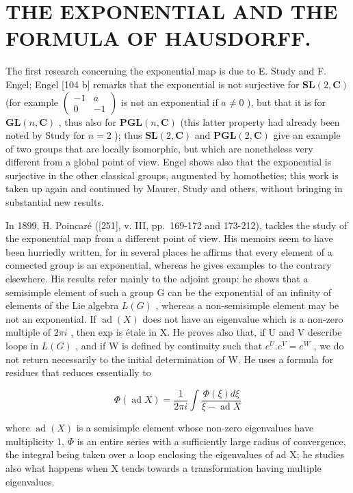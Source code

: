 \section{THE EXPONENTIAL AND THE FORMULA OF HAUSDORFF.}

The first research concerning the exponential map is due to E. Study and F. Engel; Engel {[}104 b{]} remarks that the exponential is not surjective for \(\mathbf{SL}(2, \mathbf{C})\) (for example \(\left( \begin{array}{cc} -1 & a \\ 0 & -1 \end{array} \right)\) is not an exponential if \(a \neq 0\) ), but that it is for \(\mathbf{GL}(n, \mathbf{C})\) , thus also for \(\mathbf{PGL}(n, \mathbf{C})\) (this latter property had already been noted by Study for \(n = 2\) ); thus \(\mathbf{SL}(2, \mathbf{C})\) and \(\mathbf{PGL}(2, \mathbf{C})\) give an example of two groups that are locally isomorphic, but which are nonetheless very different from a global point of view. Engel shows also that the exponential is surjective in the other classical groups, augmented by homotheties; this work is taken up again and continued by Maurer, Study and others, without bringing in substantial new results.

In 1899, H. Poincaré ({[}251{]}, v. III, pp.~169-172 and 173-212), tackles the study of the exponential map from a different point of view. His memoirs seem to have been hurriedly written, for in several places he affirms that every element of a connected group is an exponential, whereas he gives examples to the contrary elsewhere. His results refer mainly to the adjoint group: he shows that a semisimple element of such a group G can be the exponential of an infinity of elements of the Lie algebra \(L(G)\) , whereas a non-semisimple element may be not an exponential. If \(\operatorname{ad}(X)\) does not have an eigenvalue which is a non-zero multiple of \(2\pi i\) , then exp is étale in X. He proves also that, if U and V describe loops in \(L(G)\) , and if W is defined by continuity such that \(e^{U}.e^{V}=e^{W}\) , we do not return necessarily to the initial determination of W. He uses a formula for residues that reduces essentially to

\[
\Phi (\operatorname{ad} X) = \frac {1}{2 \pi i} \int \frac {\Phi (\xi) d \xi}{\xi - \operatorname{ad} X}
\]

where \(\operatorname{ad}(X)\) is a semisimple element whose non-zero eigenvalues have multiplicity 1, \(\Phi\) is an entire series with a sufficiently large radius of convergence, the integral being taken over a loop enclosing the eigenvalues of ad X; he studies also what happens when X tends towards a transformation having multiple eigenvalues.

